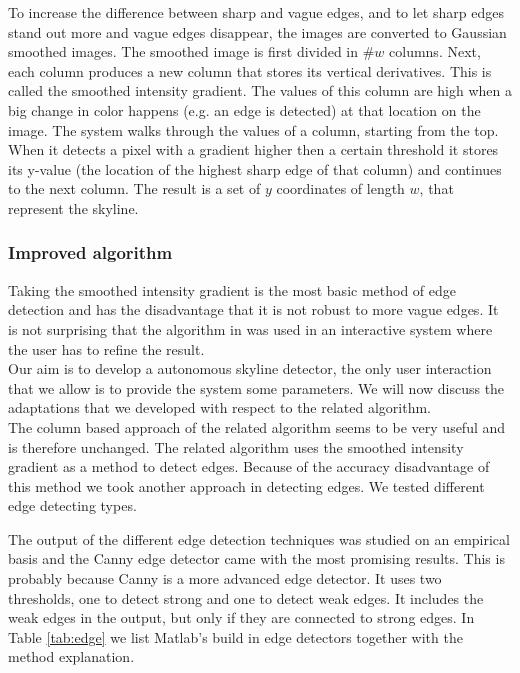 To increase the difference between sharp and vague edges, and to let sharp edges
stand out more and vague edges disappear, the images are converted to Gaussian
smoothed images.  The smoothed image is first divided in \#$w$ columns.  Next,
each column produces a new column that stores its vertical derivatives. This is
called the smoothed intensity gradient.  The values of this column are high when
a big change in color happens (e.g. an edge is detected) at that location on the
image. 
The system walks through the values of a column, starting from the top.  When it
detects a pixel with a gradient higher then a certain threshold it stores its
y-value (the location of the highest sharp edge of that column) and continues
to the next column.  The result is a set of $y$ coordinates of length $w$, that
represent the skyline. 

\subsubsection{Improved algorithm}
Taking the smoothed intensity gradient is the most basic method of edge
detection and has the disadvantage that it is not robust to more vague edges. It
is not surprising that the algorithm in \cite{Rover}
was used in an interactive system where the user has to refine the result.\\

Our aim is to develop a autonomous skyline detector, the only user interaction
that we allow is to provide the system some parameters. We will now discuss
the adaptations that we developed with respect to the related algorithm.\\

The column based approach of the related algorithm seems to be very useful and is
therefore unchanged.  The related algorithm uses the smoothed intensity gradient
as a method to detect edges. 
Because of the accuracy disadvantage of this method we took another approach in
detecting edges. We tested different edge detecting types. 

The output of the different edge detection techniques was studied on an empirical
basis and the Canny edge detector \cite{Canny} came with the most promising results. This is
probably because Canny is a more advanced edge detector.  It uses two
thresholds, one to detect strong and one to detect weak edges. It includes the weak edges in the
output, but only if they are connected to strong edges. In Table \ref{tab:edge} %
we list Matlab's build in edge detectors together with the method explanation.

